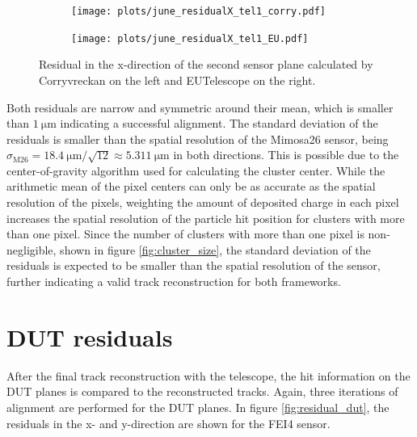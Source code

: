 \begin{figure}
  \hspace{-1cm}
  \begin{subfigure}{0.53\textwidth}
      \texttt{[image: plots/june\_residualX\_tel1\_corry.pdf]}
  \end{subfigure}
  \begin{subfigure}{0.53\textwidth}
      \texttt{[image: plots/june\_residualX\_tel1\_EU.pdf]}
  \end{subfigure}
  \caption{Residual in the x-direction of the second sensor plane calculated by Corryvreckan on the left and EUTelescope on the right.}
  \label{fig:residualX}
\end{figure}

Both residuals are narrow and symmetric around their mean, which is smaller than $\SI{1}{\micro\meter}$ indicating a successful
alignment. The standard deviation of the residuals is smaller than the spatial resolution of the Mimosa26 sensor, being
$\sigma_{\text{M26}} = \SI{18.4}{\micro\meter}/\sqrt{12} \approx \SI{5.311}{\micro\meter}$ in both directions. This is possible due to
the center-of-gravity algorithm used for calculating the cluster center. While the arithmetic mean of the pixel centers can
only be as accurate as the spatial resolution of the pixels, weighting the amount of deposited charge in each pixel increases the
spatial resolution of the particle hit position for clusters with more than one pixel. Since the number of clusters with more than
one pixel is non-negligible, shown in figure \ref{fig:cluster_size}, the standard deviation of the residuals is expected to be
smaller than the spatial resolution of the sensor, further indicating a valid track reconstruction for both frameworks.

\section{DUT residuals}
After the final track reconstruction with the telescope, the hit information on the DUT planes is compared to the
reconstructed tracks. Again, three iterations of alignment are performed for the DUT planes. In figure \ref{fig:residual_dut}, the residuals in the
x- and y-direction are shown for the FEI4 sensor.

